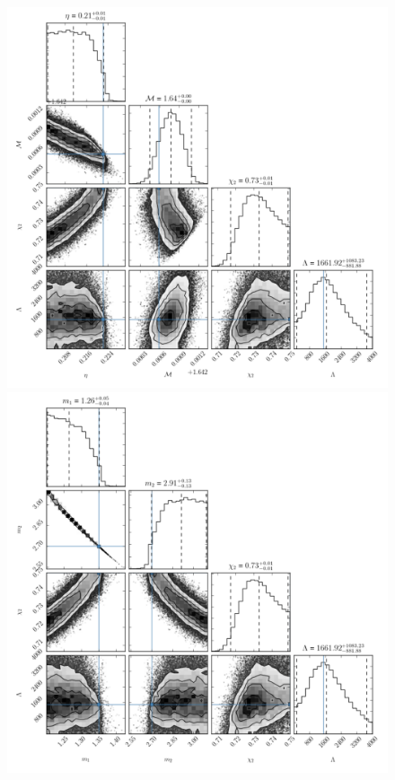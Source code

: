 \documentclass[aps,prd,amsmath,floats,floatfix, twocolumn,
superscriptaddress,nofootinbib,showpacs]{revtex4-1}
\begin{document}
%
\begin{figure}
\centering    
\includegraphics[trim={0 0 0 0},width=\columnwidth]{plots/TT_q2-00_mNS1-35_chiBH0-75_Lambda1500-0_SNR20-0_corner_eta_Mc_chi2_Lambda.pdf}
\includegraphics[trim={0 0 0 0},width=\columnwidth]{plots/TT_q2-00_mNS1-35_chiBH0-75_Lambda1500-0_SNR20-0_corner_m1_m2_chi2_Lambda.pdf}

\end{figure}
\end{document}

